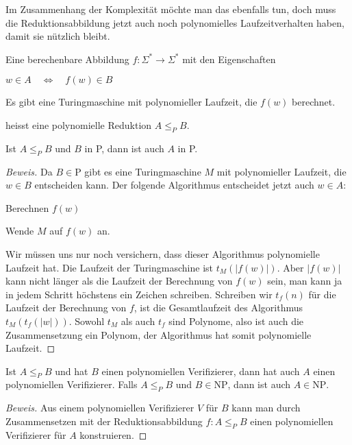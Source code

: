 Im Zusammenhang der Komplexität möchte man das ebenfalls
tun, doch muss die Reduktionsabbildung jetzt auch noch 
polynomielles Laufzeitverhalten haben, damit sie nützlich
bleibt.

\begin{definition}
Eine berechenbare Abbildung $f\colon \Sigma^*\to\Sigma^*$
mit den Eigenschaften
\begin{compactenum}
\item $w\in A\quad\Leftrightarrow\quad f(w)\in B$
\item Es gibt eine Turingmaschine mit polynomieller Laufzeit, die
$f(w)$ berechnet.
\end{compactenum}
heisst eine polynomielle Reduktion $A\le_P B$.
\end{definition}

\begin{satz}
\label{polynomiellreduction}
Ist $A\le_P B$ und $B$ in P, dann ist auch $A$ in P.
\end{satz}

\begin{proof}[Beweis]
Da $B\in\text{P}$ gibt es eine Turingmaschine $M$ mit polynomieller Laufzeit,
die $w\in B$ entscheiden kann. Der folgende Algorithmus entscheidet
jetzt auch $w\in A$:
\begin{compactenum}
\item Berechnen $f(w)$
\item Wende $M$ auf $f(w)$ an.
\end{compactenum}
Wir müssen uns nur noch versichern, dass dieser Algorithmus 
polynomielle Laufzeit hat. Die Laufzeit der Turingmaschine ist
$t_M(|f(w)|)$. Aber $|f(w)|$ kann nicht länger als die Laufzeit 
der Berechnung von $f(w)$ sein, man kann ja in jedem Schritt höchstens
ein Zeichen schreiben. Schreiben wir $t_f(n)$ für die Laufzeit
der Berechnung von $f$, ist die Gesamtlaufzeit des Algorithmus
$t_M(t_f(|w|))$. Sowohl $t_M$ als auch $t_f$ sind Polynome, 
also ist auch die Zusammensetzung ein Polynom, der Algorithmus
hat somit polynomielle Laufzeit.
\end{proof}

\begin{satz}
Ist $A\le_P B$ und hat $B$ einen polynomiellen Verifizierer, dann
hat auch $A$ einen polynomiellen Verifizierer. Falls $A\le_P B$ und 
$B\in\text{NP}$, dann ist auch $A\in\text{NP}$.
\end{satz}

\begin{proof}[Beweis]
Aus einem polynomiellen Verifizierer $V$ für $B$ kann man durch
Zusammensetzen mit der Reduktionsabbildung $f\colon A\le_P B$
einen polynomiellen Verifizierer für $A$ konstruieren.
\end{proof}

